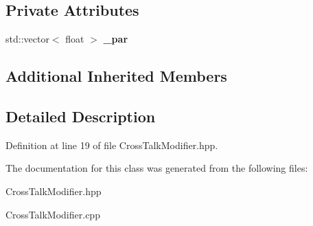 \subsection*{Private Attributes}
\begin{DoxyCompactItemize}
\item 
std\-::vector$<$ float $>$ {\bfseries \-\_\-par}\label{classdigisim_1_1CrossTalkModifier_a26a02dd37217a1ce402ef167aabfcb5b}

\end{DoxyCompactItemize}
\subsection*{Additional Inherited Members}


\subsection{Detailed Description}


Definition at line 19 of file Cross\-Talk\-Modifier.\-hpp.



The documentation for this class was generated from the following files\-:\begin{DoxyCompactItemize}
\item 
Cross\-Talk\-Modifier.\-hpp\item 
Cross\-Talk\-Modifier.\-cpp\end{DoxyCompactItemize}
